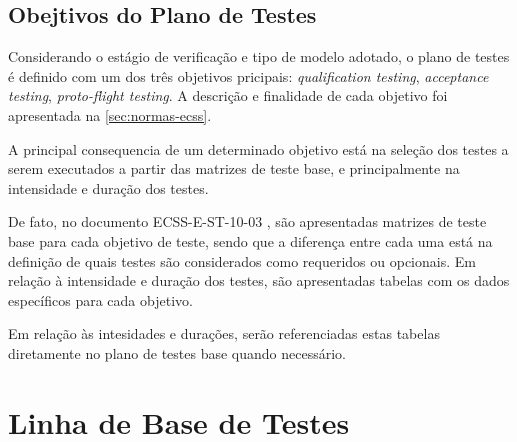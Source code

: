 
\subsection{Obejtivos do Plano de Testes}




Considerando o estágio de verificação e tipo de modelo adotado, o plano de testes é definido com um dos três objetivos pricipais: \textit{qualification testing}, \textit{acceptance testing}, \textit{proto-flight testing}.
A descrição e finalidade de cada objetivo foi apresentada na \autoref{sec:normas-ecss}.

A principal consequencia de um determinado objetivo está na seleção dos testes a serem executados a partir das matrizes de teste base, e principalmente na intensidade e duração dos testes.

De fato, no documento ECSS-E-ST-10-03 \cite{ecss-e-st-10-03}, são apresentadas matrizes de teste base para cada objetivo de teste, sendo que a diferença entre cada uma está na definição de quais testes são considerados como requeridos ou opcionais.
Em relação à intensidade e duração dos testes, são apresentadas tabelas com os dados específicos para cada objetivo.

Em relação às intesidades e durações, serão referenciadas estas tabelas diretamente no plano de testes base quando necessário.






\section{Linha de Base de Testes}

